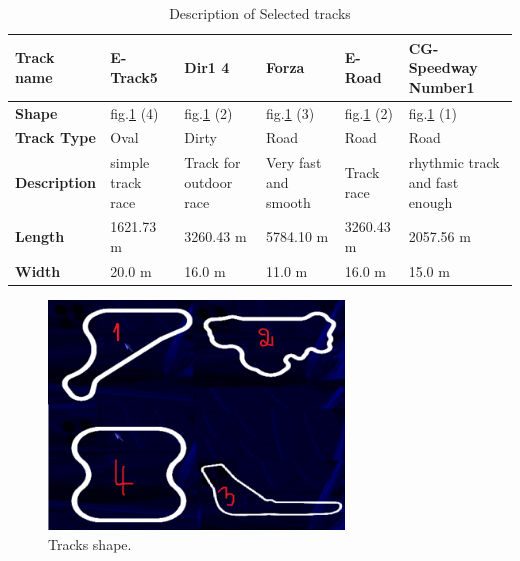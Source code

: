 \documentclass{llncs}
\begin{document}
\begin{table}[h!]
	
	\caption{Description of Selected tracks}
	\label{Tabtrack}
	\begin{tabular}{ |p{2cm}|p{2 cm}|p{2 cm}|p{2 cm}|p{2 cm}|p{2 cm}|}
		\hline
		\textbf{Track name}    & E-Track5
		& Dir1 4 
		& Forza
		& E-Road
		& CG-Speedway Number1
		\\
		\hline
		\textbf{Shape}   
		& fig.\ref{fig3} (4)
		& fig.\ref{fig3} (2)
		& fig.\ref{fig3} (3) 
		& fig.\ref{fig3} (2)
		& fig.\ref{fig3} (1)
		
		\\
		\hline
		\textbf{Track Type}   
		& Oval
		& Dirty
		& Road
		& Road
		& Road
		
		\\
		\hline
		\textbf{Description}   
		& simple track race
		
		& Track for outdoor race
		& Very fast and smooth
		& Track race
		& rhythmic track and fast enough
		
		\\
		\hline
		
		\textbf{Length}   
		& 1621.73 m
		& 3260.43 m
		& 5784.10 m
		& 3260.43 m
		& 2057.56 m
		
		\\
		\hline
		\textbf{Width}   
		& 20.0 m
		& 16.0 m
		& 11.0 m
		& 16.0 m
		& 15.0 m
		\\
		\hline
	\end{tabular} 
\end{table}
\begin{figure}[h!]
	
	\centering
	\includegraphics[width=0.7\textwidth]{fig/trackresultat.png}
	\begin{minipage}{10cm}
		\centering
		\caption{\footnotesize Tracks shape.}
		\label{fig3}
	\end{minipage} 
	
\end{figure}
\end{document}
